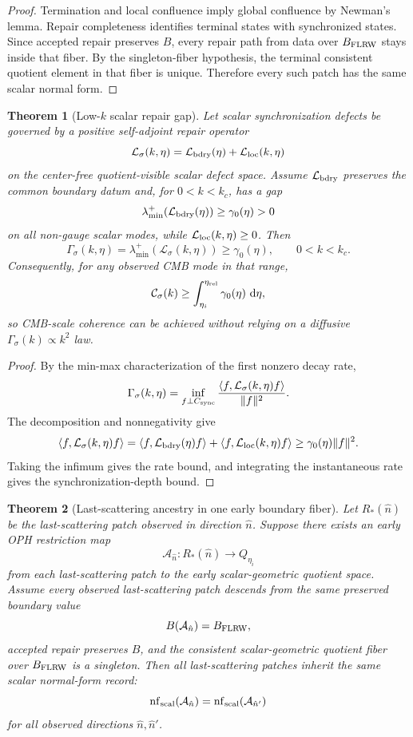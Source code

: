 \documentclass[11pt]{article}
\newtheorem{theorem}{Theorem}[section]
\newcommand{\nf}{\operatorname{nf}}
\newcommand{\dd}{\,\mathrm d}
\begin{document}
\begin{proof}
Termination and local confluence imply global confluence by Newman's lemma. Repair completeness
identifies terminal states with synchronized states. Since accepted repair preserves \(B\), every
repair path from data over \(B_{\rm FLRW}\) stays inside that fiber. By the singleton-fiber
hypothesis, the terminal consistent quotient element in that fiber is unique. Therefore every such
patch has the same scalar normal form.
\end{proof}

\begin{theorem}[Low-\(k\) scalar repair gap]\label{thm:low-k-gap}
Let scalar synchronization defects be governed by a positive self-adjoint repair operator
\[
\mathcal L_\sigma(k,\eta)
=
\mathcal L_{\rm bdry}(\eta)+\mathcal L_{\rm loc}(k,\eta)
\]
on the center-free quotient-visible scalar defect space. Assume \(\mathcal L_{\rm bdry}\) preserves
the common boundary datum and, for \(0<k<k_c\), has a gap
\[
\lambda_{\min}^+\!\left(\mathcal L_{\rm bdry}(\eta)\right)
\ge
\gamma_0(\eta)>0
\]
on all non-gauge scalar modes, while \(\mathcal L_{\rm loc}(k,\eta)\ge0\). Then
\[
\Gamma_\sigma(k,\eta)
=
\lambda_{\min}^+\!\left(\mathcal L_\sigma(k,\eta)\right)
\ge\gamma_0(\eta),
\qquad 0<k<k_c .
\]
Consequently, for any observed CMB mode in that range,
\[
\mathcal C_\sigma(k)
\ge
\int_{\eta_i}^{\eta_{\rm rel}}\gamma_0(\eta)\,\dd\eta,
\]
so CMB-scale coherence can be achieved without relying on a diffusive
\(\Gamma_\sigma(k)\propto k^2\) law.
\end{theorem}

\begin{proof}
By the min-max characterization of the first nonzero decay rate,
\[
\Gamma_\sigma(k,\eta)
=
\inf_{f\perp C_{\rm sync}}
\frac{\langle f,\mathcal L_\sigma(k,\eta)f\rangle}{\|f\|^2}.
\]
The decomposition and nonnegativity give
\[
\langle f,\mathcal L_\sigma(k,\eta)f\rangle
=
\langle f,\mathcal L_{\rm bdry}(\eta)f\rangle
+
\langle f,\mathcal L_{\rm loc}(k,\eta)f\rangle
\ge
\gamma_0(\eta)\|f\|^2.
\]
Taking the infimum gives the rate bound, and integrating the instantaneous rate gives the
synchronization-depth bound.
\end{proof}

\begin{theorem}[Last-scattering ancestry in one early boundary fiber]\label{thm:last-scattering-ancestry}
Let \(R_\ast(\hat n)\) be the last-scattering patch observed in direction \(\hat n\). Suppose there
exists an early OPH restriction map
\[
\mathcal A_{\hat n}:R_\ast(\hat n)\longrightarrow Q_{\eta_i}
\]
from each last-scattering patch to the early scalar-geometric quotient space. Assume every observed
last-scattering patch descends from the same preserved boundary value
\[
B(\mathcal A_{\hat n})=B_{\rm FLRW},
\]
accepted repair preserves \(B\), and the consistent scalar-geometric quotient fiber over
\(B_{\rm FLRW}\) is a singleton. Then all last-scattering patches inherit the same scalar normal-form
record:
\[
\nf_{\rm scal}(\mathcal A_{\hat n})
=
\nf_{\rm scal}(\mathcal A_{\hat n'})
\]
for all observed directions \(\hat n,\hat n'\).
\end{theorem}
\end{document}
